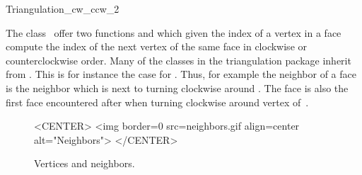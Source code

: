 

\begin{ccRefClass}{Triangulation_cw_ccw_2}  %


\ccDefinition
  
The class \ccRefName\ 
offer  two functions  and 
which given the index of a vertex in a face
compute the index of the next vertex  of the same face
in clockwise
or counterclockwise order.
Many of the classes in the triangulation package
inherit from \ccRefName. This is for instance the case for
.
 Thus, for example the neighbor 
 of a face  is
 the
neighbor  which is next to  turning clockwise
around \ccc{f}. The face 
is also the first face encountered after  when
turning clockwise around vertex 
of~\ccc{f}.



 \begin{figure}
\begin{ccTexOnly}
    \begin{center}
     
    \end{center}
\end{ccTexOnly} 
    \caption{Vertices and neighbors.
    \label{Triangulation_ref_Fig_neighbors_bis}}
  \begin{ccHtmlOnly}
<CENTER>
<img border=0 src=neighbors.gif align=center alt="Neighbors">
</CENTER>
\end{ccHtmlOnly} 
\end{figure}




\ccCreation
{}  %


\end{ccRefClass}
